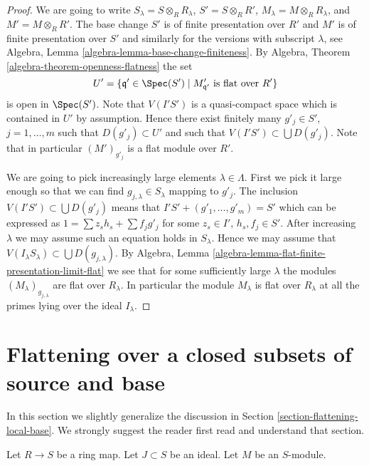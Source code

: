 \begin{proof}
We are going to write $S_\lambda = S \otimes_R R_\lambda$,
$S' = S \otimes_R R'$, $M_\lambda = M \otimes_R R_\lambda$, and
$M' = M \otimes_R R'$.
The base change $S'$ is of finite presentation over $R'$ and
$M'$ is of finite presentation over $S'$ and similarly for the
versions with subscript $\lambda$, see
Algebra, Lemma \ref{algebra-lemma-base-change-finiteness}.
By
Algebra, Theorem \ref{algebra-theorem-openness-flatness}
the set
$$
U' = \{\mathfrak q' \in \Spec(S') \mid
M'_{\mathfrak q'}\text{ is flat over }R'\}
$$
is open in $\Spec(S')$. Note that $V(I'S')$ is a quasi-compact space
which is contained in $U'$ by assumption. Hence there exist finitely many
$g'_j \in S'$, $j = 1, \ldots, m$ such that $D(g'_j) \subset U'$ and such
that $V(I'S') \subset \bigcup D(g'_j)$.
Note that in particular $(M')_{g'_j}$ is a flat module over $R'$.

\medskip\noindent
We are going to pick increasingly large elements $\lambda \in \Lambda$.
First we pick it large enough so that we can find
$g_{j, \lambda} \in S_{\lambda}$ mapping to $g'_j$.
The inclusion $V(I'S') \subset \bigcup D(g'_j)$ means that
$I'S' + (g'_1, \ldots, g'_m) = S'$ which can be expressed as
$1 = \sum z_sh_s + \sum f_jg'_j$ for some $z_s \in I'$, $h_s, f_j \in S'$.
After increasing $\lambda$ we may assume such an equation holds in
$S_\lambda$. Hence we may assume that
$V(I_\lambda S_\lambda) \subset \bigcup D(g_{j, \lambda})$. By
Algebra, Lemma \ref{algebra-lemma-flat-finite-presentation-limit-flat}
we see that for some sufficiently large $\lambda$ the modules
$(M_\lambda)_{g_{j, \lambda}}$ are flat over $R_\lambda$.
In particular the module $M_\lambda$ is flat over $R_\lambda$
at all the primes lying over the ideal $I_\lambda$.
\end{proof}









\section{Flattening over a closed subsets of source and base}
\label{section-flattening-local-source-base}

\noindent
In this section we slightly generalize the discussion in
Section \ref{section-flattening-local-base}.
We strongly suggest the reader first read and understand
that section.

\begin{situation}
\label{situation-flattening-general}
Let $R \to S$ be a ring map. Let $J \subset S$ be an ideal.
Let $M$ be an $S$-module.
\end{situation}

